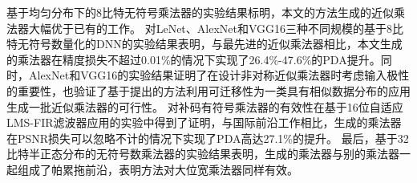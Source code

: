 基于均匀分布下的8比特无符号乘法器的实验结果标明，本文的方法生成的近似乘法器大幅优于已有的工作。
对LeNet、AlexNet和VGG16三种不同规模的基于8比特无符号数量化的DNN的实验结果表明，与最先进的近似乘法器相比，本文生成的乘法器在精度损失不超过0.01\%的情况下实现了26.4\%-47.6\%的PDA提升。同时，AlexNet和VGG16的实验结果证明了在设计非对称近似乘法器时考虑输入极性的重要性，也验证了基于提出的方法利用可迁移性为一类具有相似数据分布的应用生成一批近似乘法器的可行性。
对补码有符号乘法器的有效性在基于16位自适应LMS-FIR滤波器应用的实验中得到了证明，与国际前沿工作相比，生成的乘法器在PSNR损失可以忽略不计的情况下实现了PDA高达27.1\%的提升。
最后，基于32比特半正态分布的无符号数乘法器的实验结果表明，生成的乘法器与别的乘法器一起组成了帕累拖前沿，表明方法对大位宽乘法器同样有效。